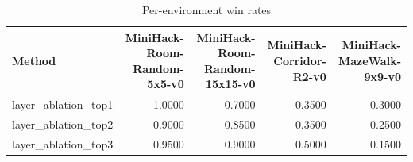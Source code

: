 \begin{table}[htbp]
\centering
\caption{Per-environment win rates}
\label{tab:per-env}
\begin{tabular}{lrrrr}
\toprule
\textbf{Method} & \textbf{MiniHack-Room-Random-5x5-v0} & \textbf{MiniHack-Room-Random-15x15-v0} & \textbf{MiniHack-Corridor-R2-v0} & \textbf{MiniHack-MazeWalk-9x9-v0} \\
\midrule
layer\_ablation\_top1 & 1.0000 & 0.7000 & 0.3500 & 0.3000 \\
layer\_ablation\_top2 & 0.9000 & 0.8500 & 0.3500 & 0.2500 \\
layer\_ablation\_top3 & 0.9500 & 0.9000 & 0.5000 & 0.1500 \\
\bottomrule
\end{tabular}
\end{table}